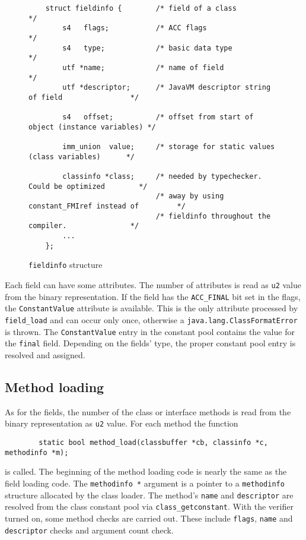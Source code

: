 \begin{figure}[h]
\begin{verbatim}
    struct fieldinfo {        /* field of a class                                 */
        s4   flags;           /* ACC flags                                        */
        s4   type;            /* basic data type                                  */
        utf *name;            /* name of field                                    */
        utf *descriptor;      /* JavaVM descriptor string of field                */
	
        s4   offset;          /* offset from start of object (instance variables) */

        imm_union  value;     /* storage for static values (class variables)      */

        classinfo *class;     /* needed by typechecker. Could be optimized        */
                              /* away by using constant_FMIref instead of         */
                              /* fieldinfo throughout the compiler.               */
        ...
    };
\end{verbatim}
\caption{\texttt{fieldinfo} structure}
\label{fieldinfostructure}
\end{figure}

Each field can have some attributes. The number of attributes is read
as \texttt{u2} value from the binary representation. If the field has
the \texttt{ACC\_FINAL} bit set in the flags, the
\texttt{ConstantValue} attribute is available. This is the only
attribute processed by \texttt{field\_load} and can occur only once,
otherwise a \texttt{java.lang.ClassFormatError} is thrown. The
\texttt{ConstantValue} entry in the constant pool contains the value
for the \texttt{final} field. Depending on the fields' type, the
proper constant pool entry is resolved and assigned.


\subsection{Method loading}

As for the fields, the number of the class or interface methods is read from
the binary representation as \texttt{u2} value. For each method the function

\begin{verbatim}
        static bool method_load(classbuffer *cb, classinfo *c, methodinfo *m);
\end{verbatim}

is called. The beginning of the method loading code is nearly the same
as the field loading code. The \texttt{methodinfo *} argument is a
pointer to a \texttt{methodinfo} structure allocated by the class
loader. The method's \texttt{name} and \texttt{descriptor} are
resolved from the class constant pool via
\texttt{class\_getconstant}. With the verifier turned on, some method
checks are carried out. These include \texttt{flags}, \texttt{name}
and \texttt{descriptor} checks and argument count check.

